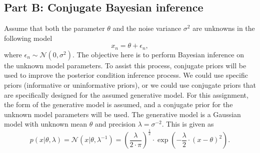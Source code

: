 \documentclass{article}
\begin{document}
\subsection{Part B: Conjugate Bayesian inference}
Assume that both the parameter $\theta$ and the noise variance $\sigma^2$ are unknowns in the following model
\begin{equation}\label{eq:Q1b_model}
x_n = \theta  + \epsilon_n,
\end{equation}
where $\epsilon_n \sim \mathcal{N}(0, \sigma^2)$. The objective here is to perform Bayesian inference on the unknown model parameters. To assist this process, conjugate priors will be used to improve the posterior condition inference process. We could use specific priors (informative or uninformative priors), or we could use conjugate priors that are specifically designed for the assumed generative model. For this assignment, the form of the generative model is assumed, and a conjugate prior for the unknown model parameters will be used. The generative model is a Gaussian model with unknown mean $\theta$ and precision $\lambda = \sigma^{-2}$. This is given as 
\begin{equation}
p(x \vert \theta, \lambda) = \mathcal{N}(x \vert \theta, \lambda^{-1}) = \left( \frac{\lambda}{2 \cdot \pi} \right)^{\frac{1}{2}} \cdot \exp\left( -\frac{\lambda}{2} \cdot \left( x - \theta \right)^2 \right).
\end{equation}
\end{document}
